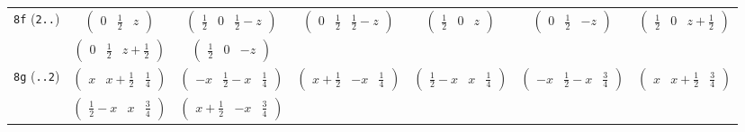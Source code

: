 \documentclass[fleqn,9pt,landscape]{jsarticle}
\begin{document}
\begin{center}
\begin{longtable}{ccccccc}
{\tt 8f} ({\tt 2..}) & $ \begin{pmatrix} 0 & \frac{1}{2} & z \end{pmatrix} $ & $ \begin{pmatrix} \frac{1}{2} & 0 & \frac{1}{2} - z \end{pmatrix} $ & $ \begin{pmatrix} 0 & \frac{1}{2} & \frac{1}{2} - z \end{pmatrix} $ & $ \begin{pmatrix} \frac{1}{2} & 0 & z \end{pmatrix} $ & $ \begin{pmatrix} 0 & \frac{1}{2} & - z \end{pmatrix} $ & $ \begin{pmatrix} \frac{1}{2} & 0 & z + \frac{1}{2} \end{pmatrix} $ \\
& $ \begin{pmatrix} 0 & \frac{1}{2} & z + \frac{1}{2} \end{pmatrix} $ & $ \begin{pmatrix} \frac{1}{2} & 0 & - z \end{pmatrix} $ & $  $ & $  $ & $  $ & $  $ \\ \hline
{\tt 8g} ({\tt ..2}) & $ \begin{pmatrix} x & x + \frac{1}{2} & \frac{1}{4} \end{pmatrix} $ & $ \begin{pmatrix} - x & \frac{1}{2} - x & \frac{1}{4} \end{pmatrix} $ & $ \begin{pmatrix} x + \frac{1}{2} & - x & \frac{1}{4} \end{pmatrix} $ & $ \begin{pmatrix} \frac{1}{2} - x & x & \frac{1}{4} \end{pmatrix} $ & $ \begin{pmatrix} - x & \frac{1}{2} - x & \frac{3}{4} \end{pmatrix} $ & $ \begin{pmatrix} x & x + \frac{1}{2} & \frac{3}{4} \end{pmatrix} $ \\
& $ \begin{pmatrix} \frac{1}{2} - x & x & \frac{3}{4} \end{pmatrix} $ & $ \begin{pmatrix} x + \frac{1}{2} & - x & \frac{3}{4} \end{pmatrix} $ & $  $ & $  $ & $  $ & $  $ \\ \hline

\end{longtable}
\end{center}
\end{document}
